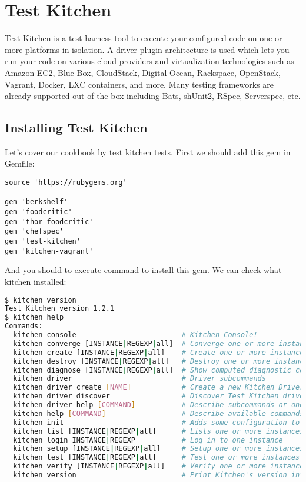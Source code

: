 \section{Test Kitchen}
\label{sec:testing-test-kitchen}

\href{http://kitchen.ci/}{Test Kitchen} is a test harness tool to execute your configured code on one or more platforms in isolation. A driver plugin architecture is used which lets you run your code on various cloud providers and virtualization technologies such as Amazon EC2, Blue Box, CloudStack, Digital Ocean, Rackspace, OpenStack, Vagrant, Docker, LXC containers, and more. Many testing frameworks are already supported out of the box including Bats, shUnit2, RSpec, Serverspec, etc.

\subsection{Installing Test Kitchen}

Let's cover our cookbook by test kitchen tests. First we should add this gem in Gemfile:

\begin{lstlisting}[label=lst:testing-test-kitchen1]
source 'https://rubygems.org'

gem 'berkshelf'
gem 'foodcritic'
gem 'thor-foodcritic'
gem 'chefspec'
gem 'test-kitchen'
gem 'kitchen-vagrant'
\end{lstlisting}

And you should to execute  command to install this gem. We can check what kitchen installed:

\begin{lstlisting}[language=Bash,label=lst:testing-test-kitchen2]
$ kitchen version
Test Kitchen version 1.2.1
$ kitchen help
Commands:
  kitchen console                         # Kitchen Console!
  kitchen converge [INSTANCE|REGEXP|all]  # Converge one or more instances
  kitchen create [INSTANCE|REGEXP|all]    # Create one or more instances
  kitchen destroy [INSTANCE|REGEXP|all]   # Destroy one or more instances
  kitchen diagnose [INSTANCE|REGEXP|all]  # Show computed diagnostic configuration
  kitchen driver                          # Driver subcommands
  kitchen driver create [NAME]            # Create a new Kitchen Driver gem project
  kitchen driver discover                 # Discover Test Kitchen drivers published on RubyGems
  kitchen driver help [COMMAND]           # Describe subcommands or one specific subcommand
  kitchen help [COMMAND]                  # Describe available commands or one specific command
  kitchen init                            # Adds some configuration to your cookbook so Kitchen can rock
  kitchen list [INSTANCE|REGEXP|all]      # Lists one or more instances
  kitchen login INSTANCE|REGEXP           # Log in to one instance
  kitchen setup [INSTANCE|REGEXP|all]     # Setup one or more instances
  kitchen test [INSTANCE|REGEXP|all]      # Test one or more instances
  kitchen verify [INSTANCE|REGEXP|all]    # Verify one or more instances
  kitchen version                         # Print Kitchen's version information
\end{lstlisting}


